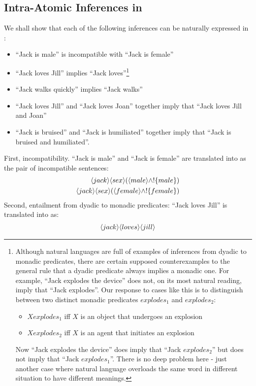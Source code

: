 \subsection{Intra-Atomic Inferences in \ELFULL{}}
We shall show that each of the following inferences can be naturally expressed in \ELABR{}:
\begin{itemize}
\item
``Jack is male'' is incompatible with ``Jack is female''
\item
``Jack loves Jill'' implies ``Jack loves''\footnote{Although natural languages are full of examples of inferences from dyadic to monadic predicates, there are certain supposed counterexamples to the general rule that a dyadic predicate always implies a monadic one. For example, ``Jack explodes the device'' does not, on its most natural reading, imply that ``Jack explodes''. Our response to cases like this is to distinguish between two distinct monadic predicates $explodes_1$ and $explodes_2$:
\begin{itemize}
\item
$X explodes_1$ iff $X$ is an object that undergoes an explosion
\item
$X explodes_2$ iff $X$ is an agent that initiates an explosion
\end{itemize}
Now ``Jack explodes the device'' does imply that ``Jack $explodes_2$'' but does not imply that ``Jack $explodes_1$''. 
There is no deep problem here - just another case where natural language overloads the same word in different situation to have different meanings.}
\item
``Jack walks quickly'' implies ``Jack walks''
\item
``Jack loves Jill'' and ``Jack loves Joan'' together imply that ``Jack loves Jill and Joan''
\item
``Jack is bruised'' and ``Jack is humiliated'' together imply that ``Jack is bruised and humiliated''.
\end{itemize}
First, incompatibility. ``Jack is male'' and ``Jack is female'' are translated into \ELABR{} as the pair of incompatible sentences:
\begin{eqnarray*}
\langle jack \rangle \langle sex \rangle (\langle male \rangle \land ! \{male\}) \\
\langle jack \rangle \langle sex \rangle (\langle female \rangle \land ! \{female\})
\end{eqnarray*}
Second, entailment from dyadic to monadic predicates:
``Jack loves Jill'' is translated into \ELABR{} as:
\begin{eqnarray*}
\langle jack \rangle \langle loves \rangle \langle jill \rangle \end{eqnarray*}
